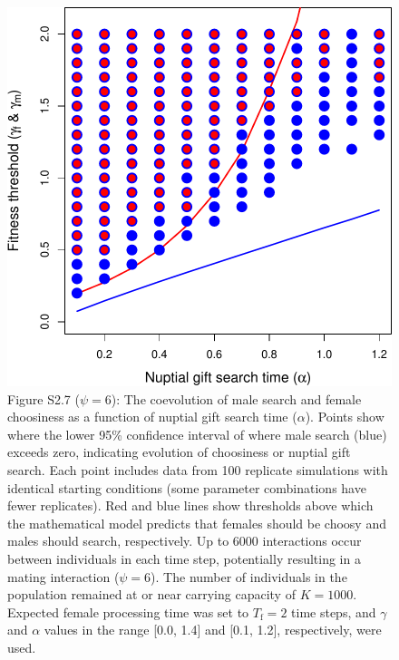 \documentclass[
]{article}
\begin{document}
\clearpage

\captionsetup{labelformat=empty}

\begin{figure}
\centering
\includegraphics{SI_files/figure-latex/unnamed-chunk-8-1.pdf}
\caption{Figure S2.7 (\(\psi = 6\)): The coevolution of male search and
female choosiness as a function of nuptial gift search time
(\(\alpha\)). Points show where the lower 95\% confidence interval of
where male search (blue) exceeds zero, indicating evolution of
choosiness or nuptial gift search. Each point includes data from 100
replicate simulations with identical starting conditions (some parameter
combinations have fewer replicates). Red and blue lines show thresholds
above which the mathematical model predicts that females should be
choosy and males should search, respectively. Up to 6000 interactions
occur between individuals in each time step, potentially resulting in a
mating interaction (\(\psi = 6\)). The number of individuals in the
population remained at or near carrying capacity of \(K = 1000\).
Expected female processing time was set to \(T_{\mathrm{f}}=2\) time
steps, and \(\gamma\) and \(\alpha\) values in the range {[}0.0, 1.4{]}
and {[}0.1, 1.2{]}, respectively, were used.}
\end{figure}

\captionsetup{labelformat=default}
\end{document}
